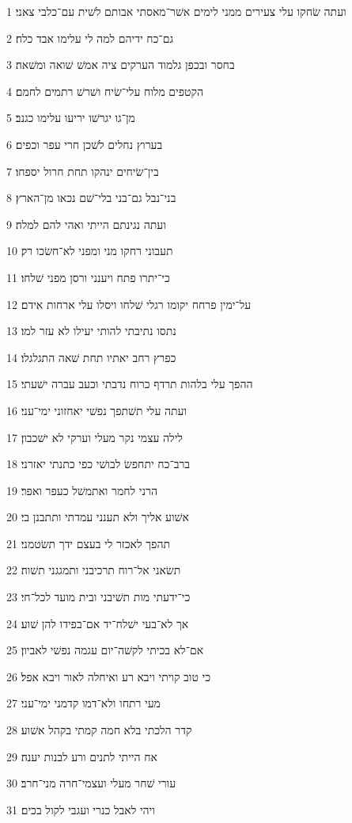 \par 1 ועתה שׂחקו עלי צעירים ממני לימים אשׁר־מאסתי אבותם לשׁית עם־כלבי צאני׃
\par 2 גם־כח ידיהם למה לי עלימו אבד כלח׃
\par 3 בחסר ובכפן גלמוד הערקים ציה אמשׁ שׁואה ומשׁאה׃
\par 4 הקטפים מלוח עלי־שׂיח ושׁרשׁ רתמים לחמם׃
\par 5 מן־גו יגרשׁו יריעו עלימו כגנב׃
\par 6 בערוץ נחלים לשׁכן חרי עפר וכפים׃
\par 7 בין־שׂיחים ינהקו תחת חרול יספחו׃
\par 8 בני־נבל גם־בני בלי־שׁם נכאו מן־הארץ׃
\par 9 ועתה נגינתם הייתי ואהי להם למלה׃
\par 10 תעבוני רחקו מני ומפני לא־חשׂכו רק׃
\par 11 כי־יתרו פתח ויענני ורסן מפני שׁלחו׃
\par 12 על־ימין פרחח יקומו רגלי שׁלחו ויסלו עלי ארחות אידם׃
\par 13 נתסו נתיבתי להותי יעילו לא עזר למו׃
\par 14 כפרץ רחב יאתיו תחת שׁאה התגלגלו׃
\par 15 ההפך עלי בלהות תרדף כרוח נדבתי וכעב עברה ישׁעתי׃
\par 16 ועתה עלי תשׁתפך נפשׁי יאחזוני ימי־עני׃
\par 17 לילה עצמי נקר מעלי וערקי לא ישׁכבון׃
\par 18 ברב־כח יתחפשׂ לבושׁי כפי כתנתי יאזרני׃
\par 19 הרני לחמר ואתמשׁל כעפר ואפר׃
\par 20 אשׁוע אליך ולא תענני עמדתי ותתבנן בי׃
\par 21 תהפך לאכזר לי בעצם ידך תשׂטמני׃
\par 22 תשׂאני אל־רוח תרכיבני ותמגגני תשׁוה׃
\par 23 כי־ידעתי מות תשׁיבני ובית מועד לכל־חי׃
\par 24 אך לא־בעי ישׁלח־יד אם־בפידו להן שׁוע׃
\par 25 אם־לא בכיתי לקשׁה־יום עגמה נפשׁי לאביון׃
\par 26 כי טוב קויתי ויבא רע ואיחלה לאור ויבא אפל׃
\par 27 מעי רתחו ולא־דמו קדמני ימי־עני׃
\par 28 קדר הלכתי בלא חמה קמתי בקהל אשׁוע׃
\par 29 אח הייתי לתנים ורע לבנות יענה׃
\par 30 עורי שׁחר מעלי ועצמי־חרה מני־חרב׃
\par 31 ויהי לאבל כנרי ועגבי לקול בכים׃


